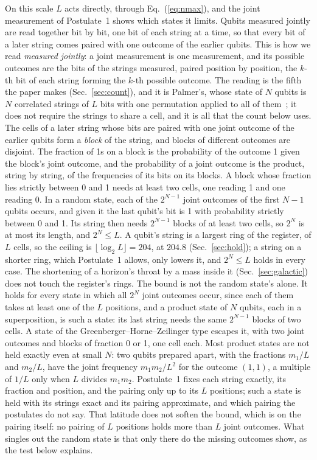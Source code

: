 \documentclass[aps,prd,twocolumn,superscriptaddress,nofootinbib,showkeys]{revtex4-2}
\begin{document}
On this scale $L$ acts directly, through Eq.~(\ref{eq:nmax}), and the joint measurement of Postulate~1 shows which states it limits. Qubits measured jointly are read together bit by bit, one bit of each string at a time, so that every bit of a later string comes paired with one outcome of the earlier qubits. This is how we read \emph{measured jointly}: a joint measurement is one measurement, and its possible outcomes are the bits of the strings measured, paired position by position, the $k$-th bit of each string forming the $k$-th possible outcome. The reading is the fifth the paper makes (Sec.~\ref{sec:count}), and it is Palmer's, whose state of $N$ qubits is $N$ correlated strings of $L$ bits with one permutation applied to all of them~\cite{palmer2026}; it does not require the strings to share a cell, and it is all that the count below uses. The cells of a later string whose bits are paired with one joint outcome of the earlier qubits form a \emph{block} of the string, and blocks of different outcomes are disjoint. The fraction of 1s on a block is the probability of the outcome 1 given the block's joint outcome, and the probability of a joint outcome is the product, string by string, of the frequencies of its bits on its blocks. A block whose fraction lies strictly between 0 and 1 needs at least two cells, one reading 1 and one reading 0. In a random state, each of the $2^{N-1}$ joint outcomes of the first $N-1$ qubits occurs, and given it the last qubit's bit is 1 with probability strictly between 0 and 1. Its string then needs $2^{N-1}$ blocks of at least two cells, so $2^N$ is at most its length, and $2^N\le L$. A qubit's string is a largest ring of the register, of $L$ cells, so the ceiling is $\lfloor\log_2L\rfloor = 204$, at $204.8$ (Sec.~\ref{sec:hold}); a string on a shorter ring, which Postulate~1 allows, only lowers it, and $2^N\le L$ holds in every case. The shortening of a horizon's throat by a mass inside it (Sec.~\ref{sec:galactic}) does not touch the register's rings. The bound is not the random state's alone. It holds for every state in which all $2^N$ joint outcomes occur, since each of them takes at least one of the $L$ positions, and a product state of $N$ qubits, each in a superposition, is such a state: its last string needs the same $2^{N-1}$ blocks of two cells. A state of the Greenberger--Horne--Zeilinger type escapes it, with two joint outcomes and blocks of fraction 0 or 1, one cell each. Most product states are not held exactly even at small $N$: two qubits prepared apart, with the fractions $m_1/L$ and $m_2/L$, have the joint frequency $m_1m_2/L^2$ for the outcome $(1,1)$, a multiple of $1/L$ only when $L$ divides $m_1m_2$. Postulate~1 fixes each string exactly, its fraction and position, and the pairing only up to its $L$ positions; such a state is held with its strings exact and its pairing approximate, and which pairing the postulates do not say. That latitude does not soften the bound, which is on the pairing itself: no pairing of $L$ positions holds more than $L$ joint outcomes. What singles out the random state is that only there do the missing outcomes show, as the test below explains.
\end{document}
